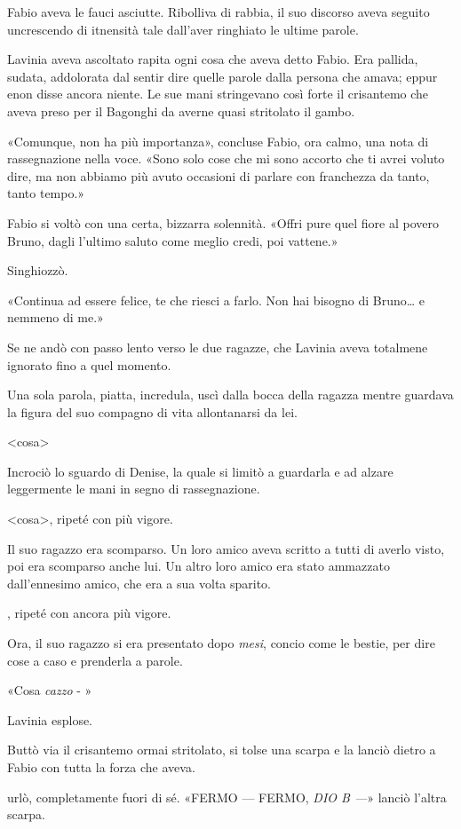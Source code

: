 Fabio aveva le fauci asciutte. Ribolliva di rabbia, il suo discorso aveva seguito uncrescendo di itnensità tale dall'aver ringhiato le ultime parole.

Lavinia aveva ascoltato rapita ogni cosa che aveva detto Fabio. Era pallida, sudata, addolorata dal sentir dire quelle parole dalla persona che amava; eppur enon disse ancora niente. Le sue mani stringevano così forte il crisantemo che aveva preso per il Bagonghi da averne quasi stritolato il gambo.

«Comunque, non ha più importanza», concluse Fabio, ora calmo, una nota di rassegnazione nella voce. «Sono solo cose che mi sono accorto che ti avrei voluto dire, ma non abbiamo più avuto occasioni di parlare con franchezza da tanto, tanto tempo.»

Fabio si voltò con una certa, bizzarra solennità. «Offri pure quel fiore al povero Bruno, dagli l'ultimo saluto come meglio credi, poi vattene.»

Singhiozzò.

«Continua ad essere felice, te che riesci a farlo. Non hai bisogno di Bruno\ldots{} e nemmeno di me.»

Se ne andò con passo lento verso le due ragazze, che Lavinia aveva totalmene ignorato fino a quel momento.

Una sola parola, piatta, incredula, uscì dalla bocca della ragazza mentre guardava la figura del suo compagno di vita allontanarsi da lei.

<cosa>

Incrociò lo sguardo di Denise, la quale si limitò a guardarla e ad alzare leggermente le mani in segno di rassegnazione.

<cosa>, ripeté con più vigore.

Il suo ragazzo era scomparso. Un loro amico aveva scritto a tutti di averlo visto, poi era scomparso anche lui. Un altro loro amico era stato ammazzato dall'ennesimo amico, che era a sua volta sparito.

, ripeté con ancora più vigore.

Ora, il suo ragazzo si era presentato dopo \emph{mesi}, concio come le bestie, per dire cose a caso e prenderla a parole.

«Cosa \emph{cazzo} - »

Lavinia esplose.

Buttò via il crisantemo ormai stritolato, si tolse una scarpa e la lanciò dietro a Fabio con tutta la forza che aveva.

 urlò, completamente fuori di sé. «FERMO --- FERMO, \emph{DIO B ---}» lanciò l'altra scarpa.

